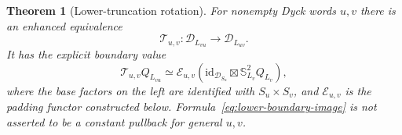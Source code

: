 \documentclass[11pt]{article}
\newtheorem{theorem}{Theorem}[section]
\theoremstyle{definition}
\begin{document}
\begin{theorem}[Lower-truncation rotation]\label{thm:lower-rotation}
For nonempty Dyck words $u,v$ there is an enhanced equivalence
\[
 \mathcal T_{u,v}:\mathcal D_{L_{vu}}\longrightarrow
                                  \mathcal D_{L_{uv}}.
\]
It has the explicit boundary value
\begin{equation}\label{eq:lower-boundary-image}
 \mathcal T_{u,v}Q_{L_{vu}}
 \simeq\mathcal E_{u,v}
       (\mathrm{id}_{\mathcal D_{S_u}}\boxtimes
                              \mathbb S_{L_v}^2Q_{L_v}),
\end{equation}
where the base factors on the left are identified with
$S_u\times S_v$, and $\mathcal E_{u,v}$ is the padding functor
constructed below. Formula~\eqref{eq:lower-boundary-image} is not
asserted to be a constant pullback for general $u,v$.
\end{theorem}
\end{document}
